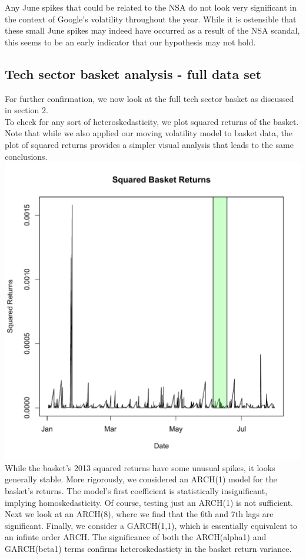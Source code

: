 \documentclass[11pt]{amsart}
\begin{document}
Any June spikes that could be related to the NSA do not look very significant in the context of Google's volatility throughout the year. While it is ostensible that these small June spikes may indeed have occurred as a result of the NSA scandal, this seems to be an early indicator that our hypothesis may not hold.

\newpage
\subsection{Tech sector basket analysis - full data set}
For further confirmation, we now look at the full tech sector basket as discussed in section 2. \\

To check for any sort of heteroskedasticity, we plot squared returns of the basket. Note that while we also
applied our moving volatility model to basket data, the plot of squared returns provides a simpler visual 
analysis that leads to the same conclusions.\\

\includegraphics[scale=0.4]{basket_sq_returns_11_25.pdf} \\

\newpage
While the basket's 2013 squared returns have some unusual spikes,  it looks generally stable. More rigorously, we considered an ARCH(1) model for the basket's returns. The model's first coefficient is statistically insignificant, implying homoskedasticity. Of course, testing just an ARCH(1) is not sufficient. Next we look at an ARCH(8), where we find that the 6th and 7th lags are significant. Finally, we consider a GARCH(1,1), which is essentially equivalent to an 
infinte order ARCH. The significance of both the ARCH(alpha1) and GARCH(beta1) terms confirms heteroskedasticty
in the basket return variance.  \\
\end{document}
